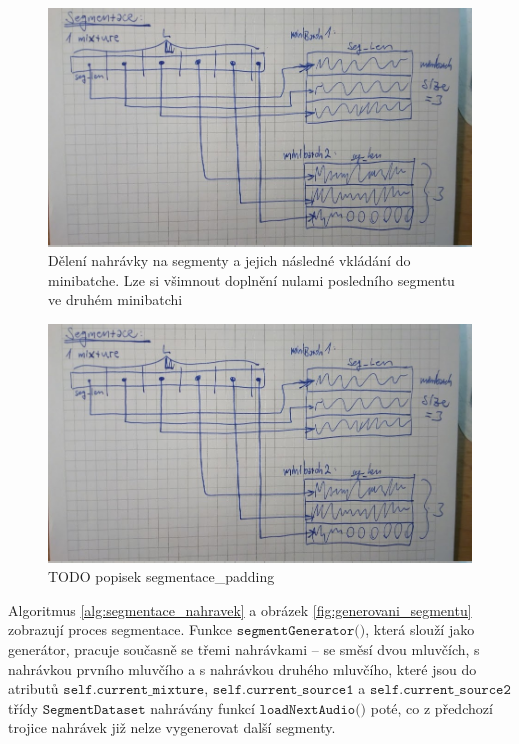 \begin{figure}[H]
    \centering
    \includegraphics[scale=0.30]{obrazky-figures/minibatch_segmentace.jpg}
    \caption{\label{fig:minibatch_segmentace}Dělení nahrávky na segmenty a jejich následné vkládání do minibatche. Lze si všimnout doplnění nulami posledního segmentu ve druhém minibatchi}
\end{figure}

\begin{figure}[H]
    \centering
    \includegraphics[scale=0.30]{obrazky-figures/minibatch_segmentace.jpg}
    \caption{\label{fig:segmentace_padding}TODO popisek segmentace\_padding}
\end{figure}

Algoritmus \ref{alg:segmentace_nahravek} a obrázek \ref{fig:generovani_segmentu} zobrazují proces segmentace. Funkce $\texttt{segmentGenerator()}$, která slouží jako generátor, pracuje současně se třemi nahrávkami -- se směsí dvou mluvčích, s nahrávkou prvního mluvčího a s nahrávkou druhého mluvčího, které jsou do atributů $\texttt{self.current\_mixture}$, $\texttt{self.current\_source1}$ a $\texttt{self.current\_source2}$ třídy $\texttt{SegmentDataset}$ nahrávány funkcí $\texttt{loadNextAudio()}$ poté, co z předchozí trojice nahrávek již nelze vygenerovat další segmenty.

